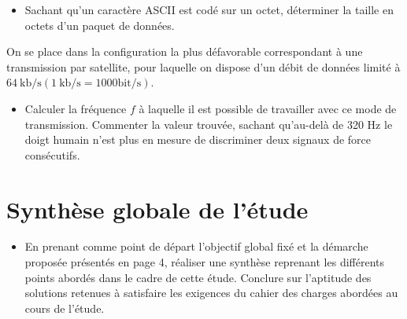 \begin{itemize}
  \item[Q41.] Sachant qu'un caractère ASCII est codé sur un octet, déterminer la taille en octets d'un paquet de données.
\end{itemize}

On se place dans la configuration la plus défavorable correspondant à une transmission par satellite, pour laquelle on dispose d'un débit de données limité à $64 \mathrm{~kb} / \mathrm{s}(1 \mathrm{~kb} / \mathrm{s}=1000 \mathrm{bit} / \mathrm{s})$.

\begin{itemize}
  \item[Q42.] Calculer la fréquence $f$ à laquelle il est possible de travailler avec ce mode de transmission. Commenter la valeur trouvée, sachant qu'au-delà de 320 Hz le doigt humain n'est plus en mesure de discriminer deux signaux de force consécutifs.
\end{itemize}

\section*{Synthèse globale de l'étude}
\begin{itemize}
  \item[Q43.] En prenant comme point de départ l'objectif global fixé et la démarche proposée présentés en page 4, réaliser une synthèse reprenant les différents points abordés dans le cadre de cette étude. Conclure sur l'aptitude des solutions retenues à satisfaire les exigences du cahier des charges abordées au cours de l'étude.
\end{itemize}

